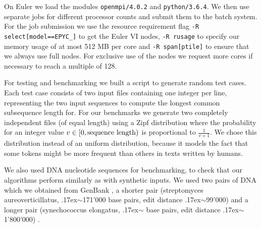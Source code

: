 On Euler we load the modules \texttt{openmpi/4.0.2} and \texttt{python/3.6.4}. We then use separate jobs for different processor counts and submit them to the %
batch system. For the job submission we use the resource requirement flag \texttt{-R \textquotesingle select[\linebreak[0]model\linebreak[0]==\linebreak[1]EPYC\_]\textquotesingle} to get the Euler VI nodes, \texttt{-R \textquotesingle rusage\linebreak[0][mem=512]\textquotesingle} to specify our memory usage of at most 512 MB per core and \texttt{-R \textquotesingle span[\linebreak[0]ptile]\textquotesingle} to ensure that we always use full nodes. For exclusive use of the nodes we request more cores if necessary to reach a multiple of 128.


For testing and benchmarking we built a script to generate random test cases. Each test case consists of two input files containing one integer per line, representing the two input sequences to compute the longest common subsequence length for. For our benchmarks we generate two completely independent files (of equal length) using a Zipf distribution \cite{Zipf} where the probability for an integer value $v \in \left[0,\linebreak[0]\text{sequence\linebreak[2] length}\right)$ is proportional to $\frac{1}{v+1}$. We chose this distribution instead of an uniform distribution, because it models the fact that some tokens might be more frequent than others in texts written by humans.

We also used DNA nucleotide sequences for benchmarking, to check that our algorithms perform similarly as with synthetic inputs. We used two pairs of DNA which we obtained from GenBank \cite{genbank}, a shorter pair (streptomyces aureoverticillatus, {\raise.17ex\hbox{$\scriptstyle\mathtt{\sim}$}}171'000 base pairs, edit distance {\raise.17ex\hbox{$\scriptstyle\mathtt{\sim}$}}99'000) \cite{smallDNA1Data, smallDNA2Data} and a longer pair (synechococcus elongatus, {\raise.17ex\hbox{$\scriptstyle\mathtt{\sim}$}} base pairs, edit distance {\raise.17ex\hbox{$\scriptstyle\mathtt{\sim}$}}1'800'000) \cite{bigDNA1Data, bigDNA2Data}.

